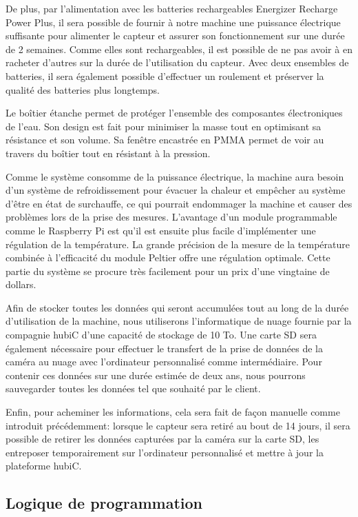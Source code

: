 De plus, par l'alimentation avec les batteries rechargeables Energizer Recharge Power Plus, il sera possible de fournir à notre machine une puissance électrique suffisante pour alimenter le capteur et assurer son fonctionnement sur une durée de 2 semaines. Comme elles sont rechargeables, il est possible de ne pas avoir à en racheter d'autres sur la durée de l'utilisation du capteur. Avec deux ensembles de batteries, il sera également possible d'effectuer un roulement et préserver la qualité des batteries plus longtemps.

Le boîtier étanche permet de protéger l'ensemble des composantes électroniques de l'eau. Son design est fait pour minimiser la masse tout en optimisant sa résistance et son volume. Sa fenêtre encastrée en PMMA permet de voir au travers du boîtier tout en résistant à la pression.

Comme le système consomme de la puissance électrique, la machine aura besoin d'un système de refroidissement pour évacuer la chaleur et empêcher au système d'être en état de surchauffe, ce qui pourrait endommager la machine et causer des problèmes lors de la prise des mesures. L'avantage d'un module programmable comme le Raspberry Pi est qu'il est ensuite plus facile d'implémenter une régulation de la température. La grande précision de la mesure de la température combinée à l'efficacité du module Peltier offre une régulation optimale. Cette partie du système se procure très facilement pour un prix d'une vingtaine de dollars.

Afin de stocker toutes les données qui seront accumulées tout au long de la durée d'utilisation de la machine, nous utiliserons l'informatique de nuage fournie par la compagnie hubiC d'une capacité de stockage de 10 To. Une carte SD sera également nécessaire pour effectuer le transfert de la prise de données de la caméra au nuage avec l'ordinateur personnalisé comme intermédiaire. Pour contenir ces données sur une durée estimée de deux ans, nous pourrons sauvegarder toutes les données tel que souhaité par le client.

Enfin, pour acheminer les informations, cela sera fait de façon manuelle comme introduit précédemment: lorsque le capteur sera retiré au bout de 14 jours, il sera possible de retirer les données capturées par la caméra sur la carte SD, les entreposer temporairement sur l'ordinateur personnalisé et mettre à jour la plateforme hubiC.

\subsection{Logique de programmation}

